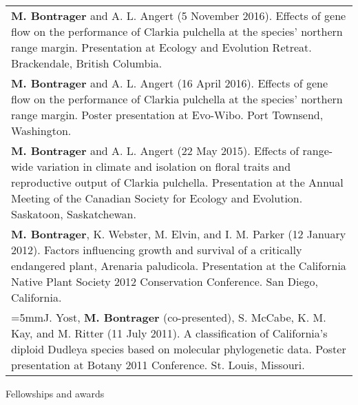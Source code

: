 \documentclass[letterpaper,11pt,oneside]{article}
\begin{document}
\def\arraystretch{1.2}
\noindent \begin{tabular}{@{} >{\raggedright\arraybackslash}p{17.2cm}}
\hangindent=5mm\textbf{M. Bontrager} and A. L. Angert (5 November 2016). Effects of gene flow on the performance of Clarkia pulchella at the species’ northern range margin. Presentation at Ecology and Evolution Retreat. Brackendale, British Columbia. \\
\hangindent=5mm\textbf{M. Bontrager} and A. L. Angert (16 April 2016). Effects of gene flow on the performance of Clarkia pulchella at the species’ northern range margin. Poster presentation at Evo-Wibo. Port Townsend, Washington. \\
\hangindent=5mm\textbf{M. Bontrager} and A. L. Angert (22 May 2015). Effects of range-wide variation in climate and isolation on floral traits and reproductive output of Clarkia pulchella. Presentation at the Annual Meeting of the Canadian Society for Ecology and Evolution. Saskatoon, Saskatchewan. \\
\hangindent=5mm\textbf{M. Bontrager}, K. Webster, M. Elvin, and I. M. Parker (12 January 2012). Factors influencing growth and survival of a critically endangered plant, Arenaria paludicola. Presentation at the California Native Plant Society 2012 Conservation Conference. San Diego, California. \\
\hangindent=5mmJ. Yost, \textbf{M. Bontrager} (co-presented), S. McCabe, K. M. Kay, and M. Ritter (11 July 2011). A classification of California’s diploid Dudleya species based on molecular phylogenetic data. Poster presentation at Botany 2011 Conference. St. Louis, Missouri. \\
\end{tabular}
\bigskip
\bigskip



\pagebreak

\noindent\Large{Fellowships and awards}
\normalsize
\bigskip
\end{document}
